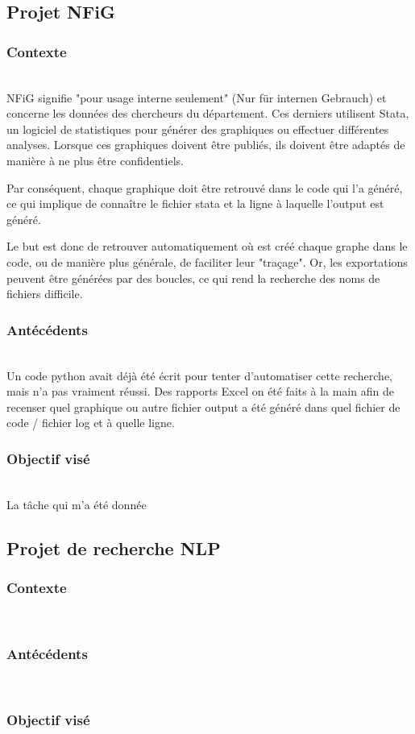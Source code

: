 \pagebreak
\subsection{Projet NFiG}

\subsubsection{Contexte}
~\\
NFiG signifie "pour usage interne seulement" (Nur für internen Gebrauch) et concerne les données des chercheurs du département. 
Ces derniers utilisent Stata, un logiciel de statistiques pour générer des graphiques ou effectuer différentes analyses.
Lorsque ces graphiques doivent être publiés, ils doivent être adaptés de manière à ne plus être confidentiels.

Par conséquent, chaque graphique doit être retrouvé dans le code qui l'a généré, ce qui implique de connaître le fichier stata et la ligne à laquelle l'output est généré.

Le but est donc de retrouver automatiquement où est créé chaque graphe dans le code, ou de manière plus générale, de faciliter leur "traçage".
Or, les exportations peuvent être générées par des boucles, ce qui rend la recherche des noms de fichiers difficile.

\subsubsection{Antécédents}
~\\
Un code python avait déjà été écrit pour tenter d'automatiser cette recherche, mais n'a pas vraiment réussi.
Des rapports Excel on été faits à la main afin de recenser quel graphique ou autre fichier output a été généré dans quel fichier de code / fichier log et à quelle ligne. 

\subsubsection{Objectif visé}
~\\ La tâche qui m'a été donnée

\pagebreak

\subsection{Projet de recherche NLP}

\subsubsection{Contexte}
~\\
\subsubsection{Antécédents}
~\\
\subsubsection{Objectif visé}
